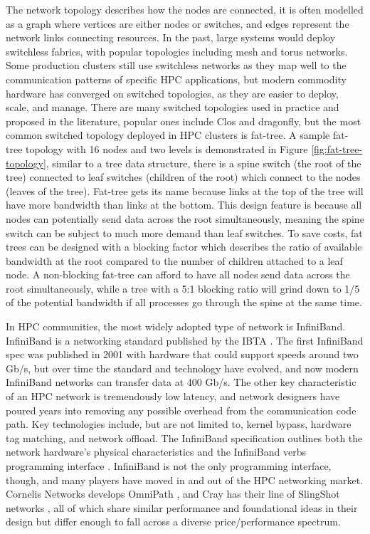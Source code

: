 The network topology describes how the nodes are connected, it is often modelled as a graph where vertices are either nodes or switches, and edges represent the network links connecting resources.
In the past, large systems would deploy switchless fabrics, with popular topologies including mesh and torus networks.
Some production clusters still use switchless networks as they map well to the communication patterns of specific \gls{HPC} applications, but modern commodity hardware has converged on switched topologies, as they are easier to deploy, scale, and manage. 
There are many switched topologies used in practice and proposed in the literature, popular ones include Clos and dragonfly, but the most common switched topology deployed in \gls{HPC} clusters is fat-tree.
A sample fat-tree topology with 16 nodes and two levels is demonstrated in Figure \ref{fig:fat-tree-topology}, similar to a tree data structure, there is a spine switch (the root of the tree) connected to leaf switches (children of the root) which connect to the nodes (leaves of the tree).
Fat-tree gets its name because links at the top of the tree will have more bandwidth than links at the bottom.
This design feature is because all nodes can potentially send data across the root simultaneously, meaning the spine switch can be subject to much more demand than leaf switches.
To save costs, fat trees can be designed with a blocking factor which describes the ratio of available bandwidth at the root compared to the number of children attached to a leaf node.
A non-blocking fat-tree can afford to have all nodes send data across the root simultaneously, while a tree with a 5:1 blocking ratio will grind down to 1/5 of the potential bandwidth if all processes go through the spine at the same time.



In \gls{HPC} communities, the most widely adopted type of network is InfiniBand. 
InfiniBand is a networking standard published by the \gls{IBTA} \cite{IBSpec}.
The first InfiniBand spec was published in 2001 with hardware that could support speeds around two Gb/s, but over time the standard and technology have evolved, and now modern InfiniBand networks can transfer data at 400 Gb/s.
The other key characteristic of an \gls{HPC} network is tremendously low latency, and network designers have poured years into removing any possible overhead from the communication code path. 
Key technologies include, but are not limited to, kernel bypass, hardware tag matching, and network offload.
The InfiniBand specification outlines both the network hardware's physical characteristics and the InfiniBand verbs programming interface \cite{IBSpec}.
InfiniBand is not the only programming interface, though, and many players have moved in and out of the \gls{HPC} networking market.
Cornelis Networks develops OmniPath \cite{Birrittella2015OmniPath}, and Cray has their line of SlingShot networks \cite{DDeSensi2020InDepthAnalysisOfSlingshot}, all of which share similar performance and foundational ideas in their design but differ enough to fall across a diverse price/performance spectrum.

